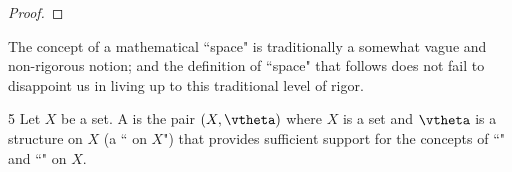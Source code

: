 \begin{proof}

\end{proof}


The concept of a mathematical ``space" is traditionally a somewhat vague and non-rigorous notion;
and the definition of ``space" that follows does not fail to disappoint us in
living up to this traditional level of rigor.
\begin{definition}
\label{def:space}
\citep{blumenthal1970}{5}
Let $X$ be a set.
A  is the pair $(X,\vtheta)$ where $X$ is a set and
$\vtheta$ is a structure on $X$ (a `` on $X$")
that provides sufficient support for the
concepts of ``" and ``"
on $X$.
\end{definition}

